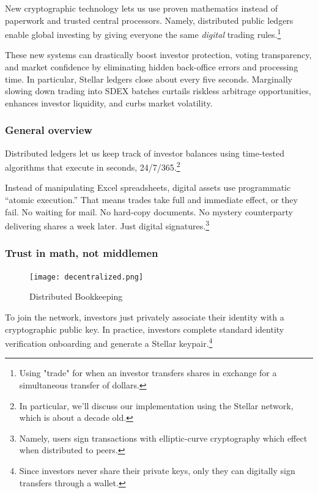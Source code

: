 \documentclass[11pt, english]{article}
\begin{document}
\begin{multicols}{2}
New cryptographic technology lets us use proven mathematics instead of paperwork and trusted central processors. Namely, distributed public ledgers enable global investing by giving everyone the same \textit{digital} trading rules.\footnote{Using "trade" for when an investor transfers shares in exchange for a simultaneous transfer of dollars.}

These new systems can drastically boost investor protection, voting transparency, and market confidence by eliminating hidden back-office errors and processing time. In particular, Stellar ledgers close about every five seconds. Marginally slowing down trading into SDEX batches curtails riskless arbitrage opportunities, enhances investor liquidity, and curbs market volatility. \cite{Veryzhenko_2017,Budish_2015,Chakrabarty_2015}

\subsubsection{General overview}

Distributed ledgers let us keep track of investor balances using time-tested algorithms that execute in seconds, 24/7/365.\footnote{In particular, we'll discuss our implementation using the Stellar network, which is about a decade old.}

Instead of manipulating Excel spreadsheets, digital assets use programmatic ``atomic execution.'' That means trades take full and immediate effect, or they fail. No waiting for mail. No hard-copy documents. No mystery counterparty delivering shares a week later. Just digital signatures.\footnote{Namely, users sign transactions with elliptic-curve cryptography which effect when distributed to peers.}

\subsubsection{Trust in math, not middlemen}

\begin{figure}[H]
    \centering
    \texttt{[image: decentralized.png]}
    \caption{Distributed Bookkeeping}
    \label{fig:decentralized}
\end{figure}

To join the network, investors just privately associate their identity with a cryptographic public key. In practice, investors complete standard identity verification onboarding and generate a Stellar keypair.\footnote{Since investors never share their private keys, only they can digitally sign transfers through a wallet.}


\end{multicols}
\end{document}
